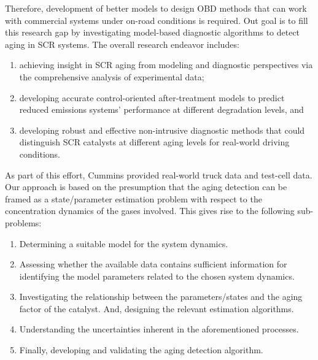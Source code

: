 Therefore, development of better models to design OBD methods that can work with commercial systems under on-road
conditions is required. Out goal is to fill this research gap by investigating model-based diagnostic algorithms to
detect aging in SCR systems. The overall research endeavor includes:

\begin{enumerate}
\item achieving insight in SCR aging from modeling and diagnostic perspectives via the comprehensive analysis of
experimental data;
\item developing accurate control-oriented after-treatment models to predict reduced emissions systems' performance at
different degradation levels, and
\item developing robust and effective non-intrusive diagnostic methods that could distinguish SCR catalysts at different
aging levels for real-world driving conditions.
\end{enumerate}

As part of this effort, Cummins provided real-world truck data and test-cell data. Our approach is based on the presumption that the aging detection can be framed as a state/parameter estimation problem with respect to the concentration dynamics of the gases involved. This gives rise to the following sub-problems:

\begin{enumerate}
\item Determining a suitable model for the system dynamics.
\item Assessing whether the available data contains sufficient information for identifying the model parameters related to the chosen system dynamics.
\item Investigating the relationship between the parameters/states and the aging
factor of the catalyst. And, designing the relevant estimation algorithms.
\item Understanding the uncertainties inherent in the aforementioned processes.
\item Finally, developing and validating the aging detection algorithm.
\end{enumerate}
